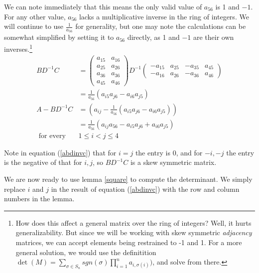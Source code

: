 \documentclass{article}
\renewcommand{\a}[1]{a_{#1}}
\newcommand{\B}{\begin{pmatrix}
a_{15} & a_{16} \\
a_{25} & a_{26} \\
a_{36} & a_{36} \\
a_{45} & a_{46}
\end{pmatrix}}
\newcommand{\C}{
\begin{pmatrix}
-a_{15} & a_{25} & -a_{35} & a_{45} \\
-a_{16} & a_{26} & -a_{36} & a_{46}
\end{pmatrix}}
\begin{document}
We can note immediately that this means the only valid value of $a_{56}$ is 1
and $-1$. For any other value, $a_{56}$ lacks a multiplicative inverse in the
ring of integers. We will continue to use $\frac{1}{a_{56}}$ for generality, but one may
note the calculations can be somewhat simplified by setting it to $a_{56}$
directly, as 1 and $-1$ are their own inverses.\footnote{How does this affect a
  general matrix over the ring of integers? Well, it hurts generalizability. But
since we will be working with skew symmetric \textit{adjacency} matrices, we can
accept elements being restrained to -1 and 1. For a more general solution, we
would use the definitition $\det(M) = \sum_{\sigma \in
  S_n}sgn(\sigma)\prod_{i=1}^na_{i,\sigma(i)})$, and solve from there.}
\begin{equation}\label{abdinvc}
  \begin{split}
BD^{-1}C &=
\B
D^{-1}
\C
\\
&= \frac{1}{\a{56}}(\a{i5}\a{j6} - \a{i6}\a{j5})
\\
A - BD^{-1}C &= (\a{ij} - \frac{1}{\a{56}} ( \a{i5}\a{j6} - \a{i6}\a{j5}))\\
&= \frac{1}{\a{56}}(\a{ij}\a{56} - \a{i5}\a{j6} + \a{i6}\a{j5})\\
\text{ for every }& 1 \leq i < j \leq 4
\end{split}
\end{equation}

Note in equation (\ref{abdinvc}) that for $i = j$ the entry is 0, and for $-i, -j$
the entry is the negative of that for $i, j$, so $BD^{-1}C$ is
a skew symmetric matrix.

We are now ready to use lemma \ref{square} to compute the determinant. We simply
replace $i$ and $j$ in the result of equation (\ref{abdinvc}) with the row and
column numbers in the lemma.
\end{document}
